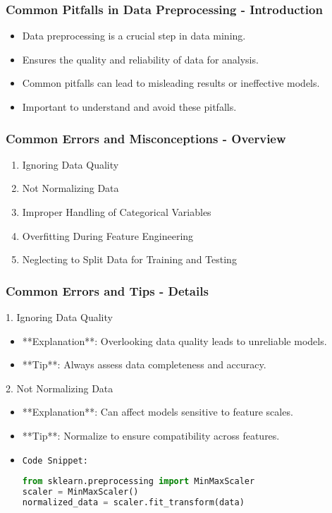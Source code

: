 \documentclass[aspectratio=169]{beamer}
\begin{document}
\begin{frame}[fragile]
    \frametitle{Common Pitfalls in Data Preprocessing - Introduction}
    \begin{itemize}
        \item Data preprocessing is a crucial step in data mining.
        \item Ensures the quality and reliability of data for analysis.
        \item Common pitfalls can lead to misleading results or ineffective models.
        \item Important to understand and avoid these pitfalls.
    \end{itemize}
\end{frame}

\begin{frame}[fragile]
    \frametitle{Common Errors and Misconceptions - Overview}
    \begin{enumerate}
        \item Ignoring Data Quality
        \item Not Normalizing Data
        \item Improper Handling of Categorical Variables
        \item Overfitting During Feature Engineering
        \item Neglecting to Split Data for Training and Testing
    \end{enumerate}
\end{frame}

\begin{frame}[fragile]
    \frametitle{Common Errors and Tips - Details}
    \begin{block}{1. Ignoring Data Quality}
        \begin{itemize}
            \item **Explanation**: Overlooking data quality leads to unreliable models.
            \item **Tip**: Always assess data completeness and accuracy.
        \end{itemize}
    \end{block}
    \begin{block}{2. Not Normalizing Data}
        \begin{itemize}
            \item **Explanation**: Can affect models sensitive to feature scales.
            \item **Tip**: Normalize to ensure compatibility across features.
            \item \texttt{Code Snippet:}
            \begin{lstlisting}[language=Python]
from sklearn.preprocessing import MinMaxScaler
scaler = MinMaxScaler()
normalized_data = scaler.fit_transform(data)
            \end{lstlisting}
        \end{itemize}
    \end{block}
\end{frame}
\end{document}
